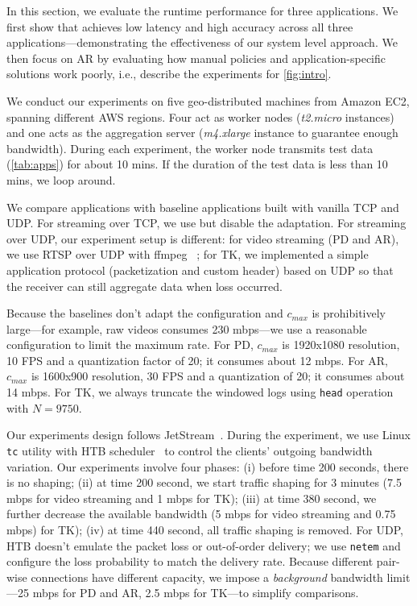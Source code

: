 In this section, we evaluate the runtime performance for three applications. We
first show that \sysname{} achieves low latency and high accuracy across all
three applications---demonstrating the effectiveness of our system level
approach. We then focus on AR by evaluating how manual policies and
application-specific solutions work poorly, i.e., describe the experiments for
\autoref{fig:intro}.

 We conduct our experiments on five geo-distributed machines
from Amazon EC2, spanning different AWS regions. Four act as worker nodes
(\textit{t2.micro} instances) and one acts as the aggregation server
(\textit{m4.xlarge} instance to guarantee enough bandwidth). During each
experiment, the worker node transmits test data (\autoref{tab:apps}) for about
10 mins. If the duration of the test data is less than 10 mins, we loop around.

We compare \sysname{} applications with baseline applications built with vanilla
TCP and UDP. For streaming over TCP, we use \sysname{} but disable the
adaptation. For streaming over UDP, our experiment setup is different: for video
streaming (PD and AR), we use RTSP over UDP with ffmpeg~\cite{bellard2012ffmpeg}
; for TK, we implemented a simple application protocol (packetization and custom
header) based on UDP so that the receiver can still aggregate data when loss
occurred.

Because the baselines don't adapt the configuration and $c_{max}$ is
prohibitively large---for example, raw videos consumes 230 mbps---we use a
reasonable configuration to limit the maximum rate. For PD, $c_{max}$ is
1920x1080 resolution, 10 FPS and a quantization factor of 20; it consumes about
12 mbps. For AR, $c_{max}$ is 1600x900 resolution, 30 FPS and a quantization of
20; it consumes about 14 mbps. For TK, we always truncate the windowed logs
using \texttt{head} operation with $N=9750$.

Our experiments design follows JetStream~\cite{rabkin2014aggregation}. During
the experiment, we use Linux \texttt{tc} utility with HTB scheduler~\cite{lartc,
  htb} to control the clients' outgoing bandwidth variation. Our experiments
involve four phases: (i) before time 200 seconds, there is no shaping; (ii) at
time 200 second, we start traffic shaping for 3 minutes (7.5 mbps for video
streaming and 1 mbps for TK); (iii) at time 380 second, we further decrease the
available bandwidth (5 mbps for video streaming and 0.75 mbps) for TK); (iv) at
time 440 second, all traffic shaping is removed. For UDP, HTB doesn't emulate
the packet loss or out-of-order delivery; we use \texttt{netem} and configure
the loss probability to match the delivery rate. Because different pair-wise
connections have different capacity, we impose a \textit{background} bandwidth
limit---25 mbps for PD and AR, 2.5 mbps for TK---to simplify comparisons.

